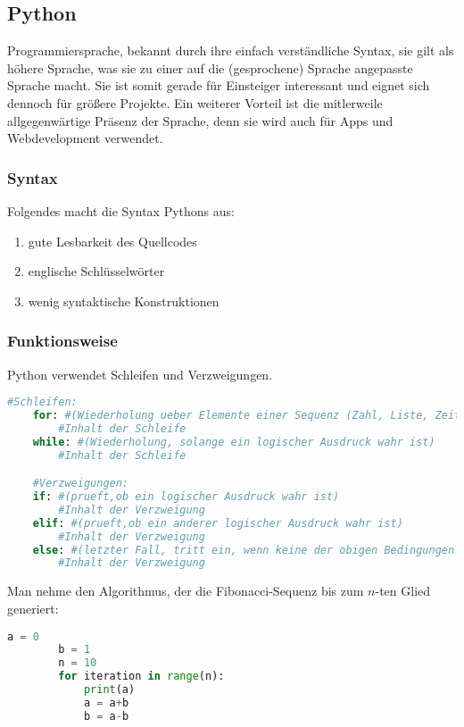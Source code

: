 \subsection{Python}
Programmiersprache, bekannt durch ihre einfach verständliche Syntax, sie gilt als höhere Sprache, was sie zu einer auf die (gesprochene) Sprache angepasste Sprache macht. Sie ist somit gerade für Einsteiger interessant und eignet sich dennoch für größere Projekte. Ein weiterer Vorteil ist die mitlerweile allgegenwärtige Präsenz der Sprache, denn sie wird auch für Apps und Webdevelopment verwendet.\\

\subsubsection{Syntax}
Folgendes macht die Syntax Pythons aus:\\
\begin{enumerate}
\item gute Lesbarkeit des Quellcodes
\item englische Schlüsselwörter
\item wenig syntaktische Konstruktionen
\end{enumerate}

\subsubsection{Funktionsweise}
Python verwendet Schleifen und Verzweigungen.\\
\begin{lstlisting}[language=Python]
	#Schleifen:
	for: #(Wiederholung ueber Elemente einer Sequenz (Zahl, Liste, Zeit...))
		#Inhalt der Schleife
	while: #(Wiederholung, solange ein logischer Ausdruck wahr ist)
		#Inhalt der Schleife

	#Verzweigungen:
	if: #(prueft,ob ein logischer Ausdruck wahr ist)
		#Inhalt der Verzweigung
	elif: #(prueft,ob ein anderer logischer Ausdruck wahr ist)
		#Inhalt der Verzweigung
	else: #(letzter Fall, tritt ein, wenn keine der obigen Bedingungen erfuellt wurde)
		#Inhalt der Verzweigung
\end{lstlisting}
\begin{Beispiel}
	Man nehme den Algorithmus, der die Fibonacci-Sequenz bis zum $n$-ten Glied generiert:\\
	\begin{lstlisting}[language=Python]
		a = 0
		b = 1
		n = 10
		for iteration in range(n):
			print(a)
			a = a+b
			b = a-b
	\end{lstlisting}
\end{Beispiel}
